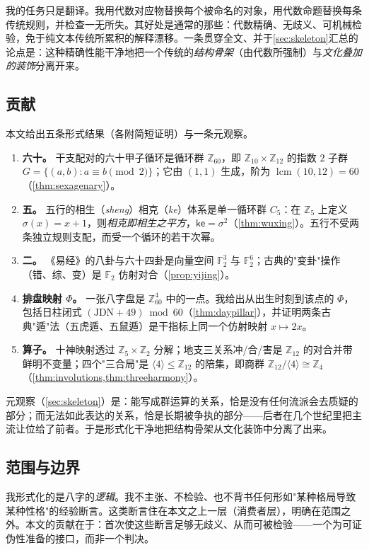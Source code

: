 \documentclass[11pt,a4paper,fontset=none]{ctexart}
\theoremstyle{definition}
\theoremstyle{remark}
\DeclareMathOperator{\lcm}{lcm}
\newcommand{\Z}{\mathbb{Z}}
\newcommand{\F}{\mathbb{F}}
\newcommand{\ke}{\mathsf{ke}}
\begin{document}
我的任务只是翻译。我用代数对应物替换每个被命名的对象，用代数命题替换每条传统规则，并检查一无所失。其好处是通常的那些：代数精确、无歧义、可机械检验，免于纯文本传统所累积的解释漂移。一条贯穿全文、并于\cref{sec:skeleton}汇总的论点是：这种精确性能干净地把一个传统的\emph{结构骨架}（由代数所强制）与\emph{文化叠加的装饰}分离开来。

\subsection{贡献}
本文给出五条形式结果（各附简短证明）与一条元观察。
\begin{enumerate}[leftmargin=*]
  \item \textbf{六十。} 干支配对的六十甲子循环是循环群 $\Z_{60}$，即 $\Z_{10}\times\Z_{12}$ 的指数 $2$ 子群 $G=\{(a,b):a\equiv b\pmod 2\}$；它由 $(1,1)$ 生成，阶为 $\lcm(10,12)=60$（\cref{thm:sexagenary}）。
  \item \textbf{五。} 五行的相生（\emph{sheng}）相克（\emph{ke}）体系是单一循环群 $C_5$：在 $\Z_5$ 上定义 $\sigma(x)=x+1$，则\emph{相克即相生之平方}，$\ke=\sigma^2$（\cref{thm:wuxing}）。五行不受两条独立规则支配，而受一个循环的若干次幂。
  \item \textbf{二。} 《易经》的八卦与六十四卦是向量空间 $\F_2^3$ 与 $\F_2^6$；古典的"变卦"操作（错、综、变）是 $\F_2$ 仿射对合（\cref{prop:yijing}）。
  \item \textbf{排盘映射 $\Phi$。} 一张八字盘是 $\Z_{60}^4$ 中的一点。我给出从出生时刻到该点的 $\Phi$，包括日柱闭式 $(\mathrm{JDN}+49)\bmod 60$（\cref{thm:daypillar}），并证明两条古典"遁"法（五虎遁、五鼠遁）是干指标上同一个仿射映射 $x\mapsto 2x$。
  \item \textbf{算子。} 十神映射透过 $\Z_5\times\Z_2$ 分解；地支三关系冲/合/害是 $\Z_{12}$ 的对合并带鲜明不变量；四个"三合局"是 $\langle 4\rangle\le\Z_{12}$ 的陪集，即商群 $\Z_{12}/\langle 4\rangle\cong\Z_4$（\cref{thm:involutions,thm:threeharmony}）。
\end{enumerate}
元观察（\cref{sec:skeleton}）是：能写成群运算的关系，恰是没有任何流派会去质疑的部分；而无法如此表达的关系，恰是长期被争执的部分——后者在几个世纪里把主流让位给了前者。于是形式化干净地把结构骨架从文化装饰中分离了出来。

\subsection{范围与边界}
我形式化的是八字的\emph{逻辑}。我不主张、不检验、也不背书任何形如"某种格局导致某种性格"的经验断言。这类断言住在本文之上一层（消费者层），明确在范围之外。本文的贡献在于：首次使这些断言足够无歧义、从而可被检验——一个为可证伪性准备的接口，而非一个判决。
\end{document}
